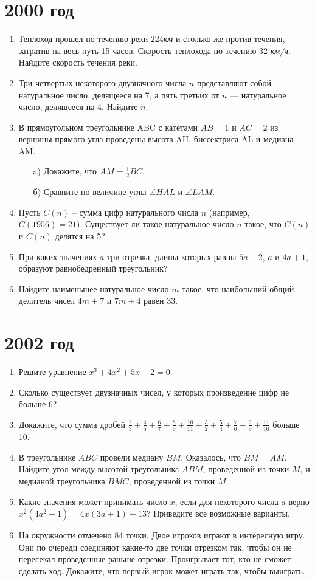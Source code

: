 \documentclass[12pt]{article}
\begin{document}
\section* {2000 год}
\begin{enumerate}
\item Теплоход прошел по течению реки 224\textit{км} и столько же против течения, затратив на весь путь 15 часов. Скорость теплохода по течению 32 \textit{км/ч}. Найдите скорость течения реки. 
\item Три четвертых некоторого двузначного числа $n$ представляют собой натуральное число, делящееся на 7, а пять третьих от $n$ --- натуральное число, делящееся на 4. Найдите $n$.

\item В прямоугольном треугольнике ABC с катетами $AB=1$ и $AC=2$ из вершины прямого угла проведены высота AH, биссектриса AL и медиана AM. 
\begin{enumerate}
\item[a)] Докажите, что $AM=\frac12BC$.
\item[б)] Сравните по величине углы $\angle HAL$ и $\angle LAM$.
\end{enumerate}
\item Пусть $C(n)$ – сумма цифр натурального числа $n$ (например, \mbox{$C(1956)=21)$}. Существует ли такое натуральное число $n$ такое, что $C(n)$ и $C(n)$ делятся на 5? 
\item При каких значениях $a$ три отрезка, длины которых равны $5a-2$, $a$ и $4a+1$, образуют равнобедренный треугольник? 
\item Найдите наименьшее натуральное число $m$ такое, что наибольший общий делитель чисел $4m + 7$ и $7m + 4$ равен $33$. 
\end{enumerate}

\section*{2002 год}
\begin{enumerate}
    \item Решите уравнение $x^3+4x^2+5x+2=0$.
    \item Сколько существует двузначных чисел, у которых произведение цифр
    не больше 6?
    \item Докажите, что сумма дробей $\frac{2}{3}+\frac{4}{5}+\frac{6}{7}+\frac{8}{9}+\frac{10}{11}+\frac{3}{2}+\frac{5}{4}+\frac{7}{6}+\frac{9}{9}+\frac{11}{10}$ больше 10.
    \item В треугольнике $ABC$ провели медиану $BM$. Оказалось, что $BM=AM$.
    Найдите угол между высотой треугольника $ABM$, проведенной из точки $M$, и медианой треугольника $BMC$, проведенной из точки $M$.
    \item Какие значения может принимать число $x$, если для некоторого числа $a$ верно
    $x^2\left(4a^2+1\right)=4x\left(3a+1\right)-13$? Приведите все возможные варианты.
    \item На окружности отмечено 84 точки. Двое игроков играют в интересную
    игру. Они по очереди соединяют какие-то две точки отрезком так, чтобы он не пересекал проведенные раньше отрезки. Проигрывает тот, кто
    не сможет сделать ход. Докажите, что первый игрок может играть так,
    чтобы выиграть. 
\end{enumerate}
\end{document}
